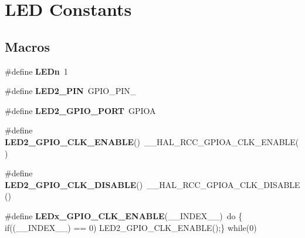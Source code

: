 \hypertarget{group___s_t_m32_f0_x_x___n_u_c_l_e_o___l_e_d}{}\section{L\+ED Constants}
\label{group___s_t_m32_f0_x_x___n_u_c_l_e_o___l_e_d}
\subsection*{Macros}
\begin{DoxyCompactItemize}
\item 
\mbox{\label{group___s_t_m32_f0_x_x___n_u_c_l_e_o___l_e_d_gab4be2480bf7d44d52aab1190a65a733c}} 
\#define {\bfseries L\+E\+Dn}~1
\item 
\mbox{\label{group___s_t_m32_f0_x_x___n_u_c_l_e_o___l_e_d_gaf6f84078113b55354d20585131b386f7}} 
\#define {\bfseries L\+E\+D2\+\_\+\+P\+IN}~G\+P\+I\+O\+\_\+\+P\+I\+N\+\_
\item 
\mbox{\label{group___s_t_m32_f0_x_x___n_u_c_l_e_o___l_e_d_gaf88822ae4b79d37c7735ce1160b59f68}} 
\#define {\bfseries L\+E\+D2\+\_\+\+G\+P\+I\+O\+\_\+\+P\+O\+RT}~G\+P\+I\+OA
\item 
\mbox{\label{group___s_t_m32_f0_x_x___n_u_c_l_e_o___l_e_d_ga810e6c23b9a3e66da601b0058ec7a245}} 
\#define {\bfseries L\+E\+D2\+\_\+\+G\+P\+I\+O\+\_\+\+C\+L\+K\+\_\+\+E\+N\+A\+B\+LE}()~\+\_\+\+\_\+\+H\+A\+L\+\_\+\+R\+C\+C\+\_\+\+G\+P\+I\+O\+A\+\_\+\+C\+L\+K\+\_\+\+E\+N\+A\+B\+LE()
\item 
\mbox{\label{group___s_t_m32_f0_x_x___n_u_c_l_e_o___l_e_d_ga57f4d9343f3fe6d94d83ab2cb45c7d75}} 
\#define {\bfseries L\+E\+D2\+\_\+\+G\+P\+I\+O\+\_\+\+C\+L\+K\+\_\+\+D\+I\+S\+A\+B\+LE}()~\+\_\+\+\_\+\+H\+A\+L\+\_\+\+R\+C\+C\+\_\+\+G\+P\+I\+O\+A\+\_\+\+C\+L\+K\+\_\+\+D\+I\+S\+A\+B\+LE()
\item 
\mbox{\label{group___s_t_m32_f0_x_x___n_u_c_l_e_o___l_e_d_ga32faaf3f04d44e7eddce1d781587fc57}} 
\#define {\bfseries L\+E\+Dx\+\_\+\+G\+P\+I\+O\+\_\+\+C\+L\+K\+\_\+\+E\+N\+A\+B\+LE}(\+\_\+\+\_\+\+I\+N\+D\+E\+X\+\_\+\+\_\+)~do \{ if((\+\_\+\+\_\+\+I\+N\+D\+E\+X\+\_\+\+\_\+) == 0) L\+E\+D2\+\_\+\+G\+P\+I\+O\+\_\+\+C\+L\+K\+\_\+\+E\+N\+A\+B\+LE();\} while(0)

\end{DoxyCompactItemize}
